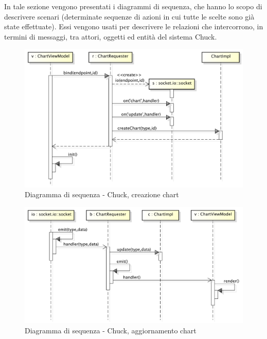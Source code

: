         In tale sezione vengono presentati i diagrammi di sequenza, che hanno lo scopo di descrivere scenari (determinate sequenze di azioni in cui tutte le scelte sono già state effettuate). Essi vengono usati per descrivere le relazioni che intercorrono, in termini di messaggi, tra attori, oggetti ed entità del sistema Chuck.
            \begin{figure}[H]
                \centering
                \includegraphics[scale=0.3]{DefinizioneDiProdotto/Pics/ChuckInserimentoChart}
                \caption{Diagramma di sequenza - Chuck, creazione chart}
            \end{figure}


            \begin{figure}[H]
                \centering
                \includegraphics[scale=0.3]{DefinizioneDiProdotto/Pics/ChuckAggiornamentoChart}
                \caption{Diagramma di sequenza - Chuck, aggiornamento chart}
            \end{figure}